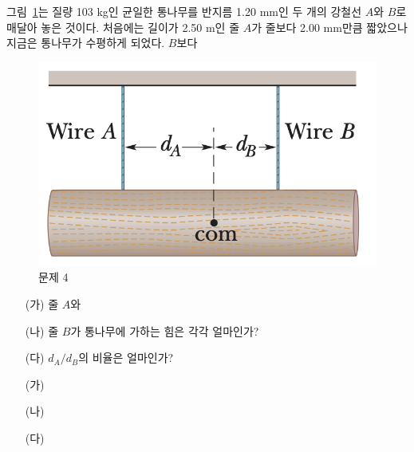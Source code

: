 \documentclass[floatfix,nofootinbib,superscriptaddress,fleqn]{revtex4-2}
\begin{document}
그림~\ref{fig:4}는 질량 103 kg인 균일한 통나무를 반지름 1.20 mm인 두
개의 강철선 $A$와 $B$로 매달아 놓은 것이다. 처음에는 길이가 2.50 m인
줄 $A$가 줄보다 2.00 mm만큼 짧았으나 지금은 통나무가 수평하게 되었다. 
$B$보다 
\begin{figure}[ht]
  \centering
\includegraphics[scale=0.25]{Qfig15-4-20220502.png}
  \caption{문제 4}
  \label{fig:4}
\end{figure}
\begin{itemize}
\item[(가)] 줄 $A$와
\item[(나)] 줄 $B$가 통나무에 가하는 힘은 각각 얼마인가? 
\item[(다)] $d_A/d_B$의 비율은 얼마인가? 
\end{itemize}

\begin{itemize}
  \item[(가)]
  \item[(나)]
  \item[(다)]
\end{itemize}
\end{document}

